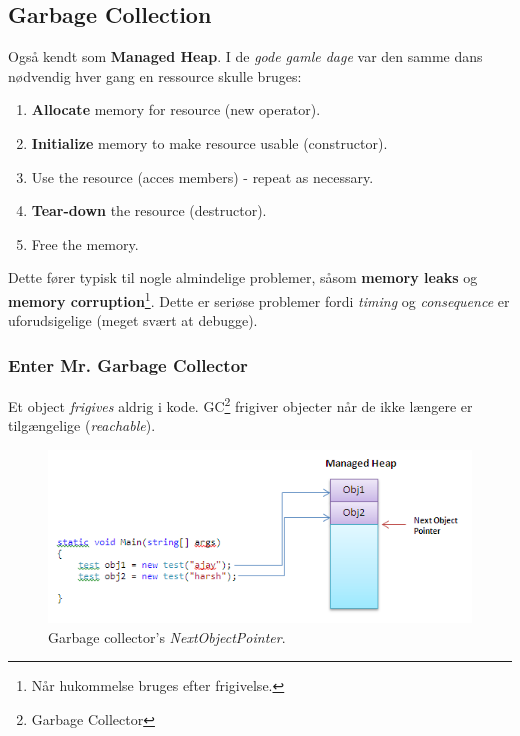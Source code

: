 \subsection{Garbage Collection}
Også kendt som \textbf{Managed Heap}. I de \textit{gode gamle dage} var den samme dans nødvendig hver gang en ressource skulle bruges:

\begin{enumerate}
	\item \textbf{Allocate} memory for resource (new operator).
	\item \textbf{Initialize} memory to make resource usable (constructor).
	\item Use the resource (acces members) - repeat as necessary.
	\item \textbf{Tear-down} the resource (destructor).
	\item Free the memory.
\end{enumerate}

Dette fører typisk til nogle almindelige problemer, såsom \textbf{memory leaks} og \textbf{memory corruption}\footnote{Når hukommelse bruges efter frigivelse.}. Dette er seriøse problemer fordi \textit{timing} og \textit{consequence} er uforudsigelige (meget svært at debugge).

\subsubsection{Enter Mr. Garbage Collector} 
Et object \textit{frigives} aldrig i kode. GC\footnote{Garbage Collector} frigiver objecter når de ikke længere er tilgængelige (\textit{reachable}).

\begin{figure}[h]
	\centering
	\includegraphics[width=\linewidth]{figs/nextobjptr}
	\caption{Garbage collector's \textit{NextObjectPointer}.}
	\label{fig:nextobjptr}
\end{figure}

